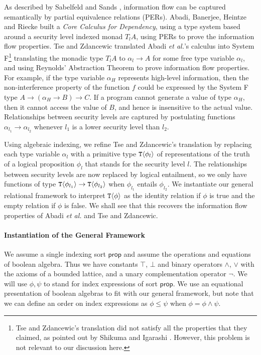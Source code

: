 \documentclass{sigplanconf}
\newcommand{\tyPrim}[2]{\textup{\texttt{#1}}\langle #2 \rangle}
\theoremstyle{examplestyle}
\theoremstyle{restatementstyle}
\begin{document}
As described by Sabelfeld and Sands \cite{sabelfeld01per}, information
flow can be captured semantically by partial equivalence relations
(PERs). Abadi, Banerjee, Heintze and Riecke \cite{abadi99core} built a
\emph{Core Calculus for Dependency}, using a type system based around
a security level indexed monad $T_lA$, using PERs to prove the
information flow properties. Tse and Zdancewic \cite{tse04translating}
translated Abadi \emph{et al.}'s calculus into System F\footnote{Tse
  and Zdancewic's translation did not satisfy all the properties that
  they claimed, as pointed out by Shikuma and Igarashi
  \cite{shikuma08proving}. However, this problem is not relevant to
  our discussion here.} translating the monadic type $T_lA$ to
$\alpha_l \to A$ for some free type variable $\alpha_l$, and using
Reynolds' Abstraction Theorem to prove information flow
properties. For example, if the type variable $\alpha_H$ represents
high-level information, then the non-interference property of the
function $f$ could be expressed by the System F type $A \to (\alpha_H
\to B) \to C$. If a program cannot generate a value of type
$\alpha_H$, then it cannot access the value of $B$, and hence is
insensitive to the actual value. Relationships between security levels
are captured by postulating functions $\alpha_{l_1} \to \alpha_{l_2}$
whenever $l_1$ is a lower security level than $l_2$.

Using algebraic indexing, we refine Tse and Zdancewic's translation by
replacing each type variable $\alpha_l$ with a primitive type
$\tyPrim{T}{\phi_l}$ of representations of the truth of a logical
proposition $\phi_l$ that stands for the security level $l$. The
relationships between security levels are now replaced by logical
entailment, so we only have functions of type $\tyPrim{T}{\phi_{l_1}} \to
\tyPrim{T}{\phi_{l_2}}$ when $\phi_{l_1}$ entails
$\phi_{l_2}$. %
We instantiate our general relational framework to interpret
$\tyPrim{T}{\phi}$ as the identity relation if $\phi$ is true and the
empty relation if $\phi$ is false. We shall see that this recovers the
information flow properties of Abadi {\em et al.} and Tse and
Zdancewic.

\paragraph{Instantiation of the General Framework}
We assume a single indexing sort $\mathsf{prop}$ and assume the
operations and equations of boolean algebra. Thus we have constants
$\top$, $\bot$ and binary operators $\land$, $\lor$ with the axioms of
a bounded lattice, and a unary complementation operator $\lnot$. We
will use $\phi, \psi$ to stand for index expressions of sort
$\mathsf{prop}$. We use an equational presentation of boolean algebras
to fit with our general framework, but note that we can define an
order on index expressions as $\phi \leq \psi$ when $\phi = \phi \land
\psi$.
\end{document}
